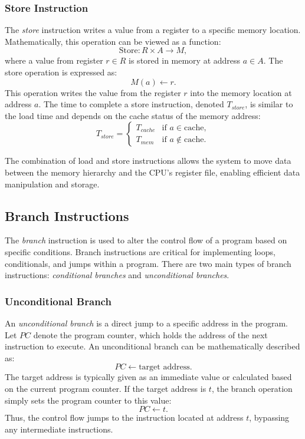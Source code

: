 \subsubsection{Store Instruction}

The \emph{store} instruction writes a value from a register to a specific memory location. Mathematically, this operation can be viewed as a function:
\[
\text{Store}: R \times A \to M,
\]
where a value from register $r \in R$ is stored in memory at address $a \in A$. The store operation is expressed as:
\[
M(a) \gets r.
\]
This operation writes the value from the register $r$ into the memory location at address $a$. The time to complete a store instruction, denoted $T_{store}$, is similar to the load time and depends on the cache status of the memory address:
\[
T_{store} = 
\begin{cases} 
	T_{cache} & \text{if } a \in \text{cache}, \\
	T_{mem}   & \text{if } a \notin \text{cache}.
\end{cases}
\]

The combination of load and store instructions allows the system to move data between the memory hierarchy and the CPU’s register file, enabling efficient data manipulation and storage.

\subsection{Branch Instructions}

The \emph{branch} instruction is used to alter the control flow of a program based on specific conditions. Branch instructions are critical for implementing loops, conditionals, and jumps within a program. There are two main types of branch instructions: \emph{conditional branches} and \emph{unconditional branches}.

\subsubsection{Unconditional Branch}

An \emph{unconditional branch} is a direct jump to a specific address in the program. Let $PC$ denote the program counter, which holds the address of the next instruction to execute. An unconditional branch can be mathematically described as:
\[
PC \gets \text{target address}.
\]
The target address is typically given as an immediate value or calculated based on the current program counter. If the target address is $t$, the branch operation simply sets the program counter to this value:
\[
PC \gets t.
\]
Thus, the control flow jumps to the instruction located at address $t$, bypassing any intermediate instructions.

